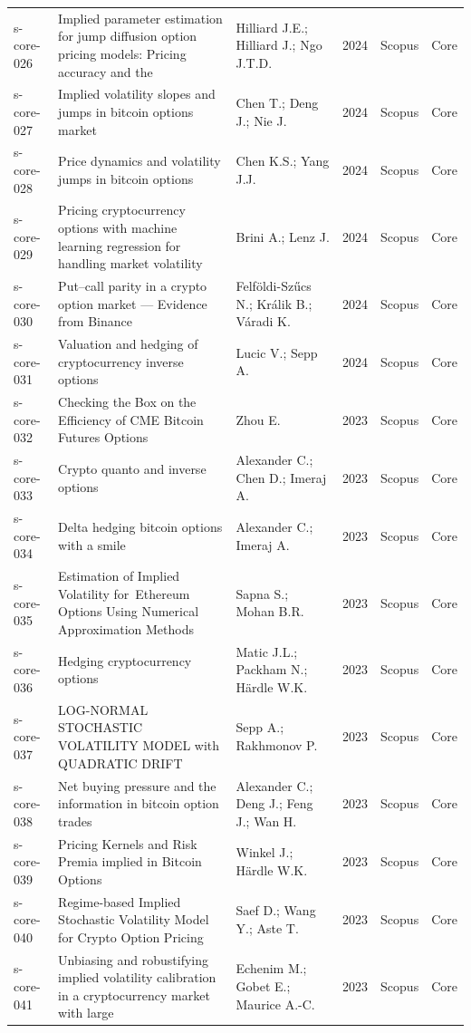 \documentclass[11pt,a4paper]{article}
\begin{document}
\begin{longtable}{p{}p{}p{}p{}p{}p{}}
s-core-026 & Implied parameter estimation for jump diffusion option pricing models: Pricing accuracy and the & Hilliard J.E.; Hilliard J.; Ngo J.T.D. & 2024 & Scopus & Core \\
s-core-027 & Implied volatility slopes and jumps in bitcoin options market & Chen T.; Deng J.; Nie J. & 2024 & Scopus & Core \\
s-core-028 & Price dynamics and volatility jumps in bitcoin options & Chen K.S.; Yang J.J. & 2024 & Scopus & Core \\
s-core-029 & Pricing cryptocurrency options with machine learning regression for handling market volatility & Brini A.; Lenz J. & 2024 & Scopus & Core \\
s-core-030 & Put–call parity in a crypto option market — Evidence from Binance & Felföldi-Szűcs N.; Králik B.; Váradi K. & 2024 & Scopus & Core \\
s-core-031 & Valuation and hedging of cryptocurrency inverse options & Lucic V.; Sepp A. & 2024 & Scopus & Core \\
s-core-032 & Checking the Box on the Efficiency of CME Bitcoin Futures Options & Zhou E. & 2023 & Scopus & Core \\
s-core-033 & Crypto quanto and inverse options & Alexander C.; Chen D.; Imeraj A. & 2023 & Scopus & Core \\
s-core-034 & Delta hedging bitcoin options with a smile & Alexander C.; Imeraj A. & 2023 & Scopus & Core \\
s-core-035 & Estimation of Implied Volatility for Ethereum Options Using Numerical Approximation Methods & Sapna S.; Mohan B.R. & 2023 & Scopus & Core \\
s-core-036 & Hedging cryptocurrency options & Matic J.L.; Packham N.; Härdle W.K. & 2023 & Scopus & Core \\
s-core-037 & LOG-NORMAL STOCHASTIC VOLATILITY MODEL with QUADRATIC DRIFT & Sepp A.; Rakhmonov P. & 2023 & Scopus & Core \\
s-core-038 & Net buying pressure and the information in bitcoin option trades & Alexander C.; Deng J.; Feng J.; Wan H. & 2023 & Scopus & Core \\
s-core-039 & Pricing Kernels and Risk Premia implied in Bitcoin Options & Winkel J.; Härdle W.K. & 2023 & Scopus & Core \\
s-core-040 & Regime-based Implied Stochastic Volatility Model for Crypto Option Pricing & Saef D.; Wang Y.; Aste T. & 2023 & Scopus & Core \\
s-core-041 & Unbiasing and robustifying implied volatility calibration in a cryptocurrency market with large & Echenim M.; Gobet E.; Maurice A.-C. & 2023 & Scopus & Core \\

\end{longtable}
\end{document}
